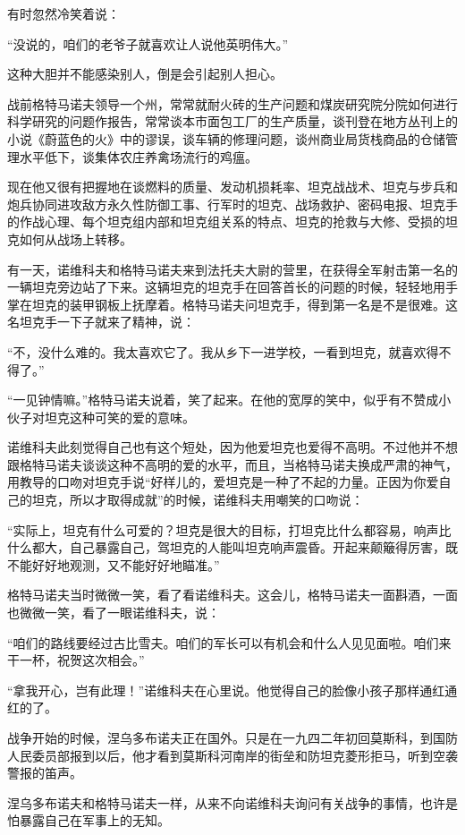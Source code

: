 有时忽然冷笑着说：

“没说的，咱们的老爷子就喜欢让人说他英明伟大。”

这种大胆并不能感染别人，倒是会引起别人担心。

战前格特马诺夫领导一个州，常常就耐火砖的生产问题和煤炭研究院分院如何进行科学研究的问题作报告，常常谈本市面包工厂的生产质量，谈刊登在地方丛刊上的小说《蔚蓝色的火》中的谬误，谈车辆的修理问题，谈州商业局货栈商品的仓储管理水平低下，谈集体农庄养禽场流行的鸡瘟。

现在他又很有把握地在谈燃料的质量、发动机损耗率、坦克战战术、坦克与步兵和炮兵协同进攻敌方永久性防御工事、行军时的坦克、战场救护、密码电报、坦克手的作战心理、每个坦克组内部和坦克组关系的特点、坦克的抢救与大修、受损的坦克如何从战场上转移。

有一天，诺维科夫和格特马诺夫来到法托夫大尉的营里，在获得全军射击第一名的一辆坦克旁边站了下来。这辆坦克的坦克手在回答首长的问题的时候，轻轻地用手掌在坦克的装甲钢板上抚摩着。格特马诺夫问坦克手，得到第一名是不是很难。这名坦克手一下子就来了精神，说：

“不，没什么难的。我太喜欢它了。我从乡下一进学校，一看到坦克，就喜欢得不得了。”

“一见钟情嘛。”格特马诺夫说着，笑了起来。在他的宽厚的笑中，似乎有不赞成小伙子对坦克这种可笑的爱的意味。

诺维科夫此刻觉得自己也有这个短处，因为他爱坦克也爱得不高明。不过他并不想跟格特马诺夫谈谈这种不高明的爱的水平，而且，当格特马诺夫换成严肃的神气，用教导的口吻对坦克手说“好样儿的，爱坦克是一种了不起的力量。正因为你爱自己的坦克，所以才取得成就”的时候，诺维科夫用嘲笑的口吻说：

“实际上，坦克有什么可爱的？坦克是很大的目标，打坦克比什么都容易，响声比什么都大，自己暴露自己，驾坦克的人能叫坦克响声震昏。开起来颠簸得厉害，既不能好好地观测，又不能好好地瞄准。”

格特马诺夫当时微微一笑，看了看诺维科夫。这会儿，格特马诺夫一面斟酒，一面也微微一笑，看了一眼诺维科夫，说：

“咱们的路线要经过古比雪夫。咱们的军长可以有机会和什么人见见面啦。咱们来干一杯，祝贺这次相会。”

“拿我开心，岂有此理！”诺维科夫在心里说。他觉得自己的脸像小孩子那样通红通红的了。

战争开始的时候，涅乌多布诺夫正在国外。只是在一九四二年初回莫斯科，到国防人民委员部报到以后，他才看到莫斯科河南岸的街垒和防坦克菱形拒马，听到空袭警报的笛声。

涅乌多布诺夫和格特马诺夫一样，从来不向诺维科夫询问有关战争的事情，也许是怕暴露自己在军事上的无知。

